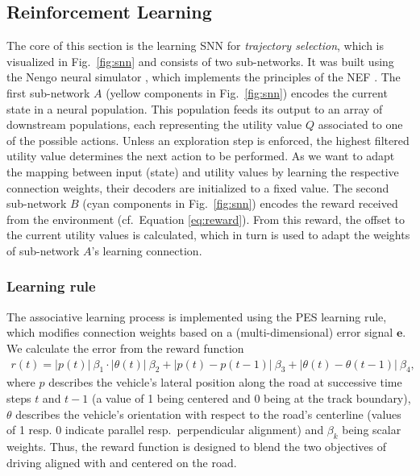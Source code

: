 \subsection{Reinforcement Learning}%
\label{subsec:reinforcement_learning_network}

The core of this section is the learning \acl{SNN} for \emph{trajectory selection}, which  is visualized in Fig.~\ref{fig:snn} and consists of two sub-networks.
It was built using the Nengo neural simulator \parencite{Bekolay2013}, which implements the principles of the \ac{NEF} \parencite{Eliasmith2003}.
The first sub-network $A$ (yellow components in Fig.~\ref{fig:snn}) encodes the current state in a neural population.
This population feeds its output to an array of downstream populations, each representing the utility value $Q$ associated to one of the possible actions.
Unless an exploration step is enforced, the highest filtered utility value determines the next action to be performed.
As we want to adapt the mapping between input (state) and utility values by learning the respective connection weights, their decoders are initialized to a fixed value. 
The second sub-network $B$ (cyan components in Fig.~\ref{fig:snn}) encodes the reward received from the environment (cf.\ Equation \eqref{eq:reward}).
From this reward, the offset to the current utility values is calculated, which in turn is used to adapt the weights of sub-network $A$'s learning connection.

\subsubsection{Learning rule}%
\label{ssubsec:learning_rule}

The associative learning process is implemented using the \ac{PES} \parencite{Bekolay2013} learning rule, which modifies connection weights based on a (multi-dimensional) error signal $\textbf{e}$.
We calculate the error from the reward function
\begin{align}
r(t) = \lvert p(t) \rvert~\beta_1 \cdot \lvert \theta(t) \rvert ~ \beta_2+ \lvert p(t)-p(t-1) \rvert ~ \beta_3+ \lvert \theta(t)-\theta(t-1) \rvert ~ \beta_4 \text{,}
\label{eq:reward}
\end{align}
where $p$ describes the vehicle's lateral position along the road at successive time steps $t$ and $t-1$ (a value of \num{1} being centered and \num{0} being at the track boundary), $\theta$ describes the vehicle's orientation with respect to the road's centerline (values of \num{1} resp. \num{0} indicate parallel resp.\ perpendicular alignment) and $\beta_k$ being scalar weights.
Thus, the reward function is designed to blend the two objectives of driving aligned with and centered on the road.

